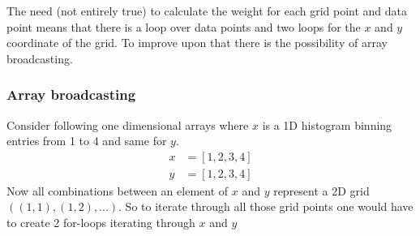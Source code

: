 \documentclass[11pt,twoside]{scrreprt}
\begin{document}
The need (not entirely true) to calculate the weight for each grid point and data point means that there is a loop over data points and two loops for the $x$ and $y$ coordinate of the grid. To improve upon that there is the possibility of array broadcasting.

\subsubsection{Array broadcasting}
Consider following one dimensional arrays where $x$ is a 1D histogram binning entries from 1 to 4 and same for $y$. 
\begin{align*}
  x &= [1, 2, 3, 4]\\
  y &= [1, 2, 3, 4]  
\end{align*}
Now all combinations between an element of $x$ and $y$ represent a 2D grid $\left((1,1), (1,2), ...\right)$. So to iterate through all those grid points one would have to create 2 for-loops iterating through $x$ and $y$
\end{document}
